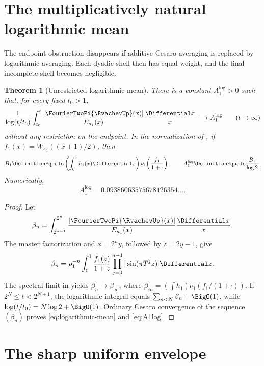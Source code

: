 \documentclass[11pt,oneside]{article}
\numberwithin{equation}{section}
\newtheorem{theorem}{Theorem}[section]
\theoremstyle{definition}
\theoremstyle{remark}
\begin{document}
\section{The multiplicatively natural logarithmic mean}
\label{sec:logarithmic-mean}

The endpoint obstruction disappears if additive Cesaro averaging is replaced by logarithmic
averaging.  Each dyadic shell then has equal weight, and the final incomplete shell becomes
negligible.

\begin{theorem}[Unrestricted logarithmic mean]
\label{thm:logarithmic-mean}
There is a constant $A_1^{\log}>0$ such that, for every fixed $t_0>1$,
\begin{equation}
 \frac1{\log(t/t_0)}\int_{t_0}^t
 \frac{|\FourierTwoPi{\RvachevUp}(x)|}{E_{\kappa_1}(x)}\frac{\Differential x}{x}
 \longrightarrow A_1^{\log}
 \qquad(t\to\infty)
 \label{eq:logarithmic-mean}
\end{equation}
without any restriction on the endpoint.  In the normalization of
, if
$f_1(x)=W_{\kappa_1}((x+1)/2)$, then
\begin{equation}
 B_1\DefinitionEquals\left(\int_0^1h_1(x)\Differential x\right)
 \nu_1\!\left(\frac{f_1}{1+\cdot}\right),
 \qquad
 A_1^{\log}\DefinitionEquals\frac{B_1}{\log2}.
 \label{eq:A1log}
\end{equation}
Numerically,
\begin{equation}
 A_1^{\log}=0.09386063575678126354\ldots .
 \label{eq:A1log-numeric}
\end{equation}
\end{theorem}

\begin{proof}
Let
\[
 \beta_n=\int_{2^{n-1}}^{2^n}
 \frac{|\FourierTwoPi{\RvachevUp}(x)|}{E_{\kappa_1}(x)}\frac{\Differential x}{x}.
\]
The master factorization and $x=2^ny$, followed by $z=2y-1$, give
\[
 \beta_n=\rho_1^{-n}\int_0^1
 \frac{f_1(z)}{1+z}\prod_{j=0}^{n-1}|\sin(\pi T^jz)|\Differential z.
\]
The spectral limit in  yields $\beta_n\to\beta_\infty$, where
$\beta_\infty=(\int h_1)\nu_1(f_1/(1+\cdot))$.  If
$2^N\le t<2^{N+1}$, the logarithmic integral equals
$\sum_{n<N}\beta_n+\BigO(1)$, while $\log(t/t_0)=N\log2+\BigO(1)$.  Ordinary Cesaro convergence of
the sequence $(\beta_n)$ proves \eqref{eq:logarithmic-mean} and
\eqref{eq:A1log}.
\end{proof}

\section{The sharp uniform envelope}
\label{sec:uniform}
\end{document}
